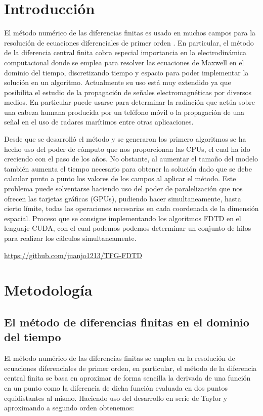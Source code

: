 \documentclass[11pt,a4paper,twoside,pdf]{article}
\numberwithin{equation}{section}
\begin{document}
\tableofcontents

\newpage

\pagestyle{fancy}
\fancyhead[RO,LE]{\leftmark}
\fancyhead[LO,RE]{\thepage}
\fancyfoot{}

\section{Introducción}
El método numérico de las diferencias finitas es usado en muchos campos para la resolución de ecuaciones diferenciales de primer orden \cite{Taflove2005}. En particular, el método de la diferencia central finita cobra especial importancia en la electrodinámica computacional donde se emplea para resolver las ecuaciones de Maxwell en el dominio del tiempo, discretizando tiempo y espacio para poder implementar la solución en un algoritmo.
Actualmente su uso está muy extendido ya que posibilita el estudio de la propagación de señales electromagnéticas por diversos medios. En particular puede usarse para determinar la radiación que actúa sobre una cabeza humana producida por un teléfono móvil o la propagación de una señal en el uso de radares marítimos entre otras aplicaciones.

Desde que se desarrolló el método y se generaron los primero algoritmos se ha hecho uso del poder de cómputo que nos proporcionan las CPUs, el cual ha ido creciendo con el paso de los años. No obstante, al aumentar el tamaño del modelo también aumenta el tiempo necesario para obtener la solución dado que se debe calcular punto a punto los valores de los campos al aplicar el método. Este problema puede solventarse haciendo uso del poder de paralelización que nos ofrecen las tarjetas gráficas (GPUs), pudiendo hacer simultaneamente, hasta cierto límite, todas las operaciones necesarias en cada coordenada de la dimensión espacial. Proceso que se consigue implementando los algoritmos FDTD en el lenguaje CUDA, con el cual podemos podemos determinar un conjunto de hilos para realizar los cálculos simultaneamente.


\url{https://github.com/juanjo1213/TFG-FDTD}



\section{Metodología}
\subsection{El método de diferencias finitas en el dominio del tiempo}
El método numérico de las diferencias finitas se emplea en la resolución de ecuaciones diferenciales de primer orden, en particular, el método de la diferencia central finita se basa en aproximar de forma sencilla la derivada de una función en un punto como la diferencia de dicha función evaluada en dos puntos equidistantes al mismo. Haciendo uso del desarrollo en serie de Taylor y aproximando a segundo orden obtenemos:
\end{document}
